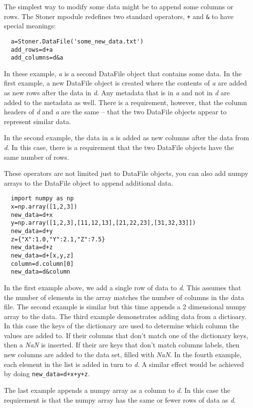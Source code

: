 \documentclass[a4paper,11pt]{scrartcl}
\begin{document}
The simplest way to modify some data might be to append some columns or rows.
The Stoner mpodule redefines two standard operators, \verb:+: and \verb:&: to
have special meanings:
\begin{lstlisting}
  a=Stoner.DataFile('some_new_data.txt')
  add_rows=d+a
  add_columns=d&a
\end{lstlisting}
In these example, \textit{a} is a second DataFile object that contains some
data. In the first example, a new DataFile object is created where the contents
of \textit{a} are added as new rows after the data in \textit{d}. Any metadata
that is in \textit{a} and not in \textit{d} are added to the metadata as well.
There is a requirement, however, that the column headers of \textit{d} and
\textit{a} are the same -- \ie that the two DataFile objects appear to represent
similar data.

In the second example, the data in \textit{a} is added as new columns after the
data from \textit{d}. In this case, there is a requirement that the two DataFile
objects have the same number of rows.

These operators are not limited just to DataFile objects, you can also add numpy
arrays to the DataFile object to append additional data.
\begin{lstlisting}
  import numpy as np
  x=np.array([1,2,3])
  new_data=d+x
  y=np.array([1,2,3],[11,12,13],[21,22,23],[31,32,33]])
  new_data=d+y
  z={"X":1.0,"Y":2.1,"Z":7.5}
  new_data=d+z
  new_data=d+[x,y,z]
  column=d.column[0]
  new_data=d&column
\end{lstlisting}
In the first example above, we add a single row of data to \textit{d}. This
assumes that the number of elements in the array matches the number of columns
in the data file. The second example is similar but this time appends a 2
dimensional numpy array to the data. The third example demonstrates adding data from a dictioary. In this case
the keys of the dictionary are used to determine which column the values are added to. If their columns that
don't match one of the dictionary keys, then a \textit{NaN} is inserted. If their are keys that don't match
columns labels, then new columns are added to the data set, filled with \textit{NaN}. In the fourth example, each element
in the list is added in turn to \textit{d}. A similar effect would be achieved by doing \verb#new_data=d+x+y+z#.

The last example appends a numpy array as
a column to \textit{d}. In this case the requirement is that the numpy array has
the same or fewer rows of data as \textit{d}.
\end{document}
